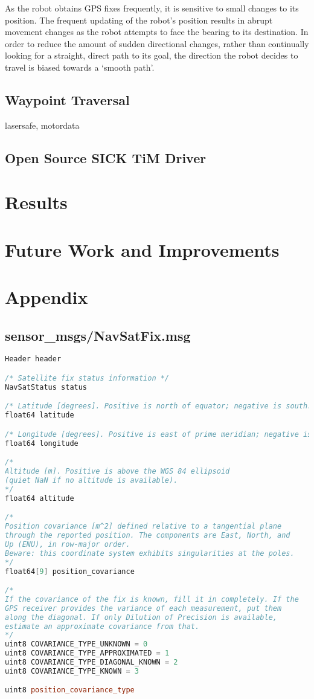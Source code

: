 \documentclass[titlepage,12pt,a4paper]{article}
\begin{document}
As the robot obtains GPS fixes frequently, it is sensitive to small changes to its position. The frequent updating of the robot's position results in abrupt movement changes as the robot attempts to face the bearing to its destination. In order to reduce the amount of sudden directional changes, rather than continually looking for a straight, direct path to its goal, the direction the robot decides to travel is biased towards a `smooth path'.

\subsection{Waypoint Traversal}
lasersafe, motordata

\subsection{Open Source SICK TiM Driver}

\pagebreak
\section{Results}

\pagebreak
\section{Future Work and Improvements}

\pagebreak
\section{Appendix}


\subsection{sensor\_msgs/NavSatFix.msg}
\begin{lstlisting}[language=C++]
Header header

/* Satellite fix status information */
NavSatStatus status

/* Latitude [degrees]. Positive is north of equator; negative is south. */
float64 latitude

/* Longitude [degrees]. Positive is east of prime meridian; negative is west. */
float64 longitude

/*
Altitude [m]. Positive is above the WGS 84 ellipsoid
(quiet NaN if no altitude is available).
*/
float64 altitude

/*
Position covariance [m^2] defined relative to a tangential plane
through the reported position. The components are East, North, and
Up (ENU), in row-major order.
Beware: this coordinate system exhibits singularities at the poles.
*/
float64[9] position_covariance

/*
If the covariance of the fix is known, fill it in completely. If the
GPS receiver provides the variance of each measurement, put them
along the diagonal. If only Dilution of Precision is available,
estimate an approximate covariance from that.
*/
uint8 COVARIANCE_TYPE_UNKNOWN = 0
uint8 COVARIANCE_TYPE_APPROXIMATED = 1
uint8 COVARIANCE_TYPE_DIAGONAL_KNOWN = 2
uint8 COVARIANCE_TYPE_KNOWN = 3

uint8 position_covariance_type
\end{lstlisting}
\end{document}

